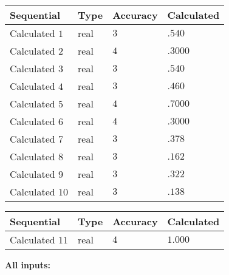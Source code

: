\documentclass[12pt]{article}
\begin{document}
  
\noindent\begin{tabular}{|l|l|l|l|}
\hline
 Sequential & Type & Accuracy & Calculated \\ 
\hline
 
 
  Calculated $           1$ & real & $           3 $ & 
 $ .540 $ 
 \\  \hline  
 
 
  Calculated $           2$ & real & $           4 $ & 
 $ .3000 $ 
 \\  \hline  
 
 
  Calculated $           3$ & real & $           3 $ & 
 $ .540 $ 
 \\  \hline  
 
 
  Calculated $           4$ & real & $           3 $ & 
 $ .460 $ 
 \\  \hline  
 
 
  Calculated $           5$ & real & $           4 $ & 
 $ .7000 $ 
 \\  \hline  
 
 
  Calculated $           6$ & real & $           4 $ & 
 $ .3000 $ 
 \\  \hline  
 
 
  Calculated $           7$ & real & $           3 $ & 
 $ .378 $ 
 \\  \hline  
 
 
  Calculated $           8$ & real & $           3 $ & 
 $ .162 $ 
 \\  \hline  
 
 
  Calculated $           9$ & real & $           3 $ & 
 $ .322 $ 
 \\  \hline  
 
 
  Calculated $          10$ & real & $           3 $ & 
 $ .138 $ 
 \\  \hline  
 \end{tabular}
   
   
  
  
\noindent\begin{tabular}{|l|l|l|l|}
\hline
 Sequential & Type & Accuracy & Calculated \\ 
\hline
 
 
  Calculated $          11$ & real & $           4 $ & 
 $ 1.000 $ 
 \\  \hline  
 \end{tabular}
   
   
   
   
\noindent\vspace{0.1in}\hspace{-0.08in} {\textbf{\Large{All inputs: }}}
   
\end{document}

